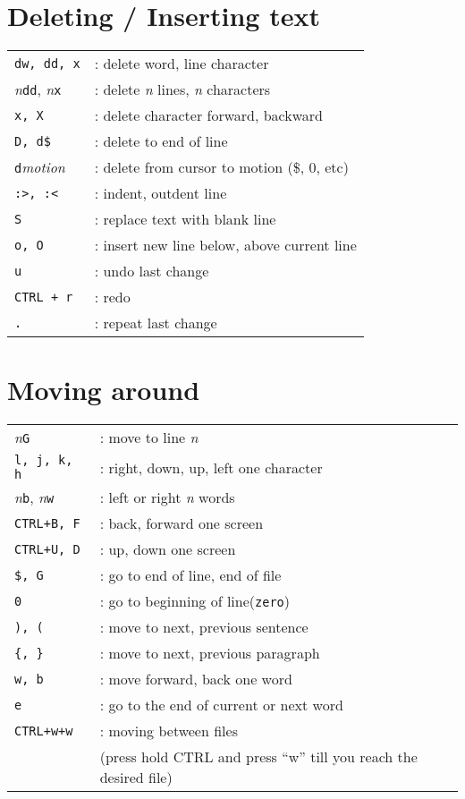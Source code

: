 \documentclass{article}
\begin{document}
\section{Deleting / Inserting text}
\begin{tabular}{l l}
\texttt{dw, dd, x} & 			: delete word, line character\\
\textsl{n}\texttt{dd}, \textsl{n}\texttt{x} & 	: delete \textsl{n} lines, \textsl{n} characters\\
\texttt{x, X}		&	: delete character forward, backward\\
\texttt{D, d\$}	& : delete to end of line\\
\texttt{d}\textsl{motion}	&	: delete from cursor to motion (\$, 0, etc)\\
\texttt{:>, :<}	 &		: indent, outdent line\\
\texttt{S}	& 	: replace text with blank line\\
\texttt{o, O}	& 	: insert new line below, above current line\\
\texttt{u} 	&		: undo last change\\
\texttt{CTRL + r} & : redo\\
\texttt{.}	&	: repeat last change\\
\end{tabular}
\section{Moving around}
\begin{tabular}{l l}
\textsl{n}\texttt{G} 	&	: move to line \textsl{n}\\
\texttt{l, j, k, h}		&		: right, down, up, left one character\\
\textsl{n}\texttt{b}, \textsl{n}\texttt{w}	&	: left or right \textsl{n} words\\
\texttt{CTRL+B, F}	& 		: back, forward one screen\\
\texttt{CTRL+U, D}	& 		: up, down one screen\\
\texttt{\$, G} & 				: go to end of line, end of file\\
\texttt{0}	&				: go to beginning of line(\texttt{zero})\\
\texttt{), (} 	&				: move to next, previous sentence\\
\texttt{\{, \}} 	&				: move to next, previous paragraph\\ 
\texttt{w, b}   &				: move forward, back one word\\
\texttt{e}		&			: go to the end of current or next word\\
\texttt{CTRL+w+w}       &                       : moving between files \\
& (press hold CTRL and press ``w'' till you reach the desired file) \\

\end{tabular}
\end{document}
